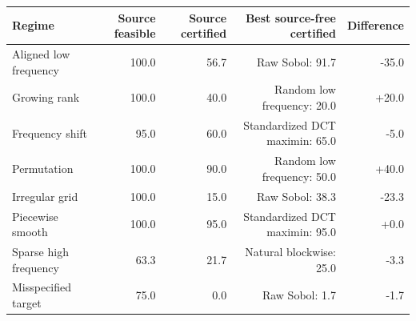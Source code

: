 \begin{tabular}{lrrrr}
\toprule
Regime & Source feasible & Source certified & Best source-free certified & Difference \\
\midrule
Aligned low frequency & 100.0 & 56.7 & Raw Sobol: 91.7 & -35.0 \\
Growing rank & 100.0 & 40.0 & Random low frequency: 20.0 & +20.0 \\
Frequency shift & 95.0 & 60.0 & Standardized DCT maximin: 65.0 & -5.0 \\
Permutation & 100.0 & 90.0 & Random low frequency: 50.0 & +40.0 \\
Irregular grid & 100.0 & 15.0 & Raw Sobol: 38.3 & -23.3 \\
Piecewise smooth & 100.0 & 95.0 & Standardized DCT maximin: 95.0 & +0.0 \\
Sparse high frequency & 63.3 & 21.7 & Natural blockwise: 25.0 & -3.3 \\
Misspecified target & 75.0 & 0.0 & Raw Sobol: 1.7 & -1.7 \\
\bottomrule
\end{tabular}

